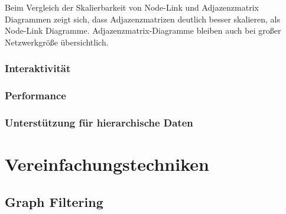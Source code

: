Beim Vergleich der Skalierbarkeit von Node-Link und Adjazenzmatrix Diagrammen zeigt sich, dass Adjazenzmatrizen deutlich besser skalieren, als Node-Link Diagramme. Adjazenzmatrix-Diagramme bleiben auch bei großer Netzwerkgröße übersichtlich.

\subsubsection{Interaktivität}



\subsubsection{Performance}



\subsubsection{Unterstützung für hierarchische Daten}



\section{Vereinfachungstechniken}

\subsection{Graph Filtering}